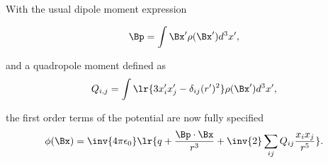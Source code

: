 With the usual dipole moment expression

\begin{dmath}\label{eqn:emtLecture8:580}
\Bp = \int \Bx' \rho(\Bx') d^3 x',
\end{dmath}

and a quadropole moment defined as
\begin{dmath}\label{eqn:emtLecture8:600}
Q_{i,j} = \int \lr{ 3 x_i' x_j' - \delta_{ij} (r')^2 } \rho(\Bx') d^3 x',
\end{dmath}

the first order terms of the potential are now fully specified
\begin{dmath}\label{eqn:emtLecture8:620}
\phi(\Bx)
=
\inv{4 \pi \epsilon_0}
\lr{
q + \frac{\Bp \cdot \Bx}{r^3} +
\inv{2} \sum_{ij} Q_{ij} \frac{x_i x_j}{r^5}
}.
\end{dmath}
